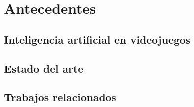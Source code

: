 \chapter{Antecedentes}

\section{Inteligencia artificial en videojuegos}


\section{Estado del arte}

\section{Trabajos relacionados}
